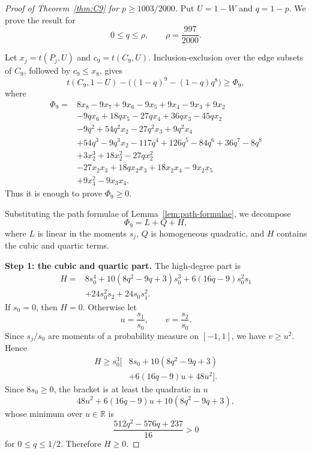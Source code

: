 \documentclass[11pt]{article}
\begin{document}
\begin{proof}[Proof of Theorem~\ref{thm:C9} for $p\ge1003/2000$]
Put $U=1-W$ and $q=1-p$.  We prove the result for
\[
        0\le q\le \rho,
        \qquad
        \rho=\frac{997}{2000}.
\]

Let $x_j=t(P_j,U)$ and $c_9=t(C_9,U)$.  Inclusion-exclusion over the edge subsets of $C_9$, followed by $c_9\le x_8$, gives
\[
        t(C_9,1-U)-\bigl((1-q)^9-(1-q)q^8\bigr)\ge \Phi_9,
\]
where
\begin{equation}\label{eq:Phi9-path}
\begin{aligned}
\Phi_9={}&
8x_8-9x_7+9x_6-9x_5+9x_4-9x_3+9x_2\\
&-9q x_6+18q x_5-27q x_4+36q x_3-45q x_2\\
&-9q^2+54q^2x_2-27q^2x_3+9q^2x_4\\
&+54q^3-9q^3x_2-117q^4+126q^5-84q^6+36q^7-8q^8\\
&+3x_2^3+18x_2^2-27qx_2^2\\
&-27x_2x_3+18qx_2x_3+18x_2x_4-9x_2x_5\\
&+9x_3^2-9x_3x_4.
\end{aligned}
\end{equation}
Thus it is enough to prove $\Phi_9\ge0$.

Substituting the path formulae of Lemma~\ref{lem:path-formulae}, we decompose
\[
        \Phi_9=L+Q+H,
\]
where $L$ is linear in the moments $s_j$, $Q$ is homogeneous quadratic, and $H$ contains the cubic and quartic terms.

\medskip
\noindent\textbf{Step 1: the cubic and quartic part.}
The high-degree part is
\begin{equation}\label{eq:H9}
\begin{aligned}
H={}&8s_0^4
+10(8q^2-9q+3)s_0^3
+6(16q-9)s_0^2s_1\\
&+24s_0^2s_2+24s_0s_1^2.
\end{aligned}
\end{equation}
If $s_0=0$, then $H=0$.  Otherwise let
\[
        u=\frac{s_1}{s_0},
        \qquad
        v=\frac{s_2}{s_0}.
\]
Since $s_j/s_0$ are moments of a probability measure on $[-1,1]$, we have $v\ge u^2$.  Hence
\[
\begin{aligned}
H\ge s_0^3\bigl[&8s_0+10(8q^2-9q+3)\\
&+6(16q-9)u+48u^2\bigr].
\end{aligned}
\]
Since $8s_0\ge0$, the bracket is at least the quadratic in $u$
\[
        48u^2+6(16q-9)u+10(8q^2-9q+3),
\]
whose minimum over $u\in\mathbb R$ is
\[
        \frac{512q^2-576q+237}{16}>0
\]
for $0\le q\le1/2$.  Therefore $H\ge0$.


\end{proof}
\end{document}
